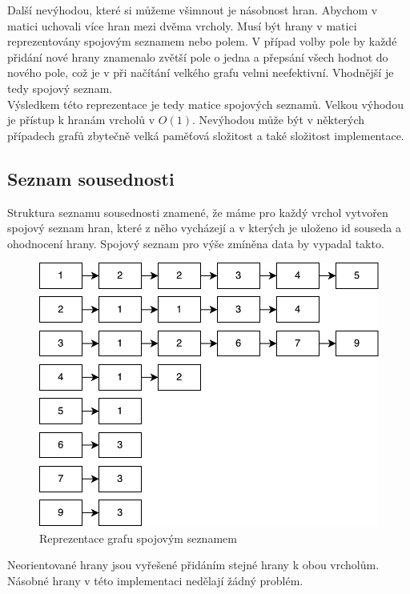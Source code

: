 Další nevýhodou, které si můžeme všimnout je násobnost hran. Abychom v matici uchovali více hran mezi dvěma vrcholy. Musí být hrany v matici reprezentovány spojovým seznamem nebo polem. V případ volby pole by každé přidání nové hrany znamenalo zvětší pole o jedna a přepsání všech hodnot do nového pole, což je v při načítání velkého grafu velmi neefektivní. Vhodnější je tedy spojový seznam.\\

Výsledkem této reprezentace je tedy matice spojových seznamů. Velkou výhodou je přístup k hranám vrcholů v $O(1)$. Nevýhodou může být v některých případech grafů zbytečně velká paměťová složitost a také složitost implementace.


\subsection{Seznam sousednosti}
Struktura seznamu sousednosti znamené, že máme pro každý vrchol vytvořen spojový seznam hran, které z něho vycházejí a v kterých je uloženo id souseda a ohodnocení hrany. Spojový seznam pro výše zmíněna data by vypadal takto.\\

\begin{figure}[!h]
	\centering
	 \includegraphics[scale=0.75]{spojak.pdf}
	\caption{Reprezentace grafu spojovým seznamem}
\end{figure}

Neorientované hrany jsou vyřešené přidáním stejné hrany k obou vrcholům. Násobné hrany v této implementaci nedělají žádný problém.\\

